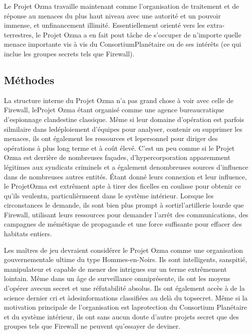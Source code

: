 Le Projet Ozma travaille maintenant comme l'organisation de traitement et de réponse au menaces du plus haut niveau avec une autorité et un pouvoir immense, et unfinancement illimité. Essentiellement orienté vers les extra-terrestres, le Projet Ozma a en fait pout tâche de s'occuper de n'importe quelle menace importante vis à vis du ConsortiumPlanétaire ou de ses intérêts (ce qui inclue les groupes secrets tels que Firewall). 

\subsection{Méthodes} 

La structure interne du Projet Ozma n'a pas grand chose à voir avec celle de Firewall, leProjet Ozma étant organisé comme une agence bureaucratique d'espionnage clandestine classique. Même si leur domaine d'opération est parfois silmilaire dans ledéploiement d'équipes pour analyser, contenir ou supprimer les menaces, ils ont également les ressources et lepersonnel pour diriger des opérations à plus long terme et à coût élevé. C'est un peu comme si le Projet Ozma est derrière de nombreuses façades, d'hypercorporation apparemment légitimes aux syndicats criminels et a également denombreuses sources d'influence dans de nombreuses autres entités. Étant donné leurs connexion et leur influence, le ProjetOzma est extrêment apte à tirer des ficelles en coulisse pour obtenir ce qu'ils veulentn, particulièrmeent dans le système intérieur. Lorsque les circonstances le demande, ils sont bien plus prompt à sortirl'artillerie lourde que Firewall, utilisant leurs ressources pour demander l'arrêt des communications, des campagnes de mémétique de propagande et une force suffisante pour effacer des habitats entiers. 

Les maîtres de jeu devraient considérer le Projet Ozma comme une organisation gouvernementale ultime du type Hommes-en-Noirs. Ils sont intelligents, sanspitié, manipulateur et capable de mener des intrigues sur un terme extrêmement lointain. Même dans un âge de surveillance omniprésente, ils ont les moyens d'opérer avecun secret et une réfutabilité absolus. Ils ont également accès à de la science dernier cri et àdesinformations classifiées au delà du topsecret. Même si la motivation principale de l'organisation est laprotection du Consortium Planétaire et du système intérieur, ils ont sans aucun doute d'autre projets secret que des groupes tels que Firewall ne peuvent qu'essayer de deviner. 


